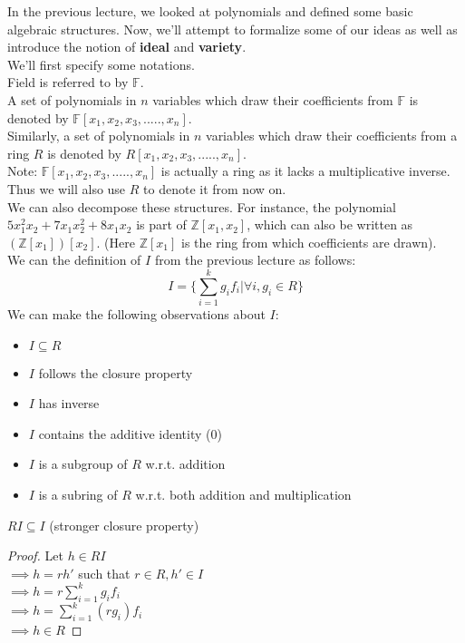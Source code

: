 In the previous lecture, we looked at polynomials and defined some basic algebraic structures. Now, we'll attempt to formalize some of our ideas as well as introduce the notion of \textbf{ideal} and \textbf{variety}.\\

We'll first specify some notations.\\
Field is referred to by $\mathbb{F}$.\\
A set of polynomials in $n$ variables which draw their coefficients from $\mathbb{F}$ is denoted by $\mathbb{F}[x_1,x_2,x_3,.....,x_n]$.\\
Similarly, a set of polynomials in $n$ variables which draw their coefficients from a ring $R$ is denoted by $R[x_1,x_2,x_3,.....,x_n]$.\\
Note: $\mathbb{F}[x_1,x_2,x_3,.....,x_n]$ is actually a ring as it lacks a multiplicative inverse. Thus we will also use $R$ to denote it from now on.\\

We can also decompose these structures. For instance, the polynomial $5x_1^2x_2 + 7x_1x_2^2 + 8x_1x_2$ is part of $\mathbb{Z}[x_1,x_2]$, which can also be written as $(\mathbb{Z}[x_1])[x_2]$. (Here $\mathbb{Z}[x_1]$ is the ring from which coefficients are drawn).\\

We can the definition of $I$ from the previous lecture as follows:
\begin{equation}
I = \{\sum\limits_{i=1}^{k} g_{i}f_{i}| \forall i, g_i \in R\}
\end{equation}
We can make the following observations about $I$:
\begin{itemize}
\item $I \subseteq R$
\item $I$ follows the closure property
\item $I$ has inverse
\item $I$ contains the additive identity (0)
\item $I$ is a subgroup of $R$ w.r.t. addition
\item $I$ is a subring of $R$ w.r.t. both addition and multiplication\\
\end{itemize}

\begin{observation}
$RI \subseteq I$ (stronger closure property)
\end{observation}
\begin{proof}
Let $h \in RI$\\
$\implies h=rh'$ such that $r \in R, h' \in I$\\
$\implies h=r\sum\limits_{i=1}^{k} g_{i}f_{i}$\\
$\implies h=\sum\limits_{i=1}^{k} (rg_{i})f_{i}$\\
$\implies h \in R$
\end{proof}

